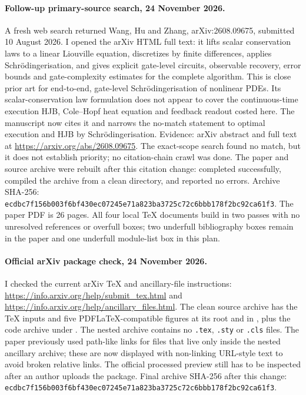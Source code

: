 \documentclass[11pt,a4paper]{article}
\begin{document}
\paragraph{Follow-up primary-source search, 24 November 2026.}
A fresh web search returned Wang, Hu and Zhang, arXiv:2608.09675, submitted
10 August 2026. I opened the arXiv HTML full text: it lifts scalar
conservation laws to a linear Liouville equation, discretizes by finite
differences, applies Schr\"odingerisation, and gives explicit gate-level
circuits, observable recovery, error bounds and gate-complexity estimates
for the complete algorithm. This is close prior art for end-to-end,
gate-level Schr\"odingerisation of nonlinear PDEs. Its scalar-conservation
law formulation does not appear to cover the continuous-time execution HJB,
Cole--Hopf heat equation and feedback readout costed here. The manuscript
now cites it and narrows the no-match statement to optimal execution and
HJB by Schr\"odingerisation. Evidence: arXiv abstract and full text at
\url{https://arxiv.org/abs/2608.09675}. The exact-scope search found no
match, but it does not establish priority; no citation-chain crawl was done.
The paper and source archive were rebuilt after this citation change:
 completed successfully, compiled the
archive from a clean directory, and 
reported no errors. Archive SHA-256:
\texttt{ecdbc7f156b003f6bf430ec07245e71a823ba3725c72c6bbb178f2bc92ca61f3}.
The paper PDF is 26 pages. All four local TeX documents build in two passes
with no unresolved references or overfull boxes; two underfull bibliography
boxes remain in the paper and one underfull module-list box in this plan.

\paragraph{Official arXiv package check, 24 November 2026.}
I checked the current arXiv TeX and ancillary-file instructions:
\url{https://info.arxiv.org/help/submit_tex.html} and
\url{https://info.arxiv.org/help/ancillary_files.html}. The clean source
archive has the TeX inputs and five PDFLaTeX-compatible figures at its root
and in , plus the code archive under . The nested
archive contains no \texttt{.tex}, \texttt{.sty} or \texttt{.cls} files. The
paper previously used path-like links for files that live only inside the
nested ancillary archive; these are now displayed with non-linking URL-style
text to avoid broken relative links. The official processed preview still
has to be inspected after an author uploads the package. Final archive
SHA-256 after this change:
\texttt{ecdbc7f156b003f6bf430ec07245e71a823ba3725c72c6bbb178f2bc92ca61f3}.
\end{document}
